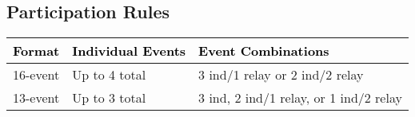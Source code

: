 
\subsection*{Participation Rules}

\begin{table}[H]
\centering
\renewcommand{\arraystretch}{1.4}
\begin{tabular}{p{3.5cm} p{4.5cm} p{6cm}}
\toprule
\rowcolor{teamprimary!25}
\textbf{\textcolor{black}{Format}} & \textbf{\textcolor{black}{Individual Events}} & \textbf{\textcolor{black}{Event Combinations}} \\
\midrule
\rowcolor{teamsecondary!15}
16-event & Up to 4 total & 3 ind/1 relay or 2 ind/2 relay \\
\rowcolor{teamprimary!10}
13-event & Up to 3 total & 3 ind, 2 ind/1 relay, or 1 ind/2 relay \\
\bottomrule
\end{tabular}
\end{table}